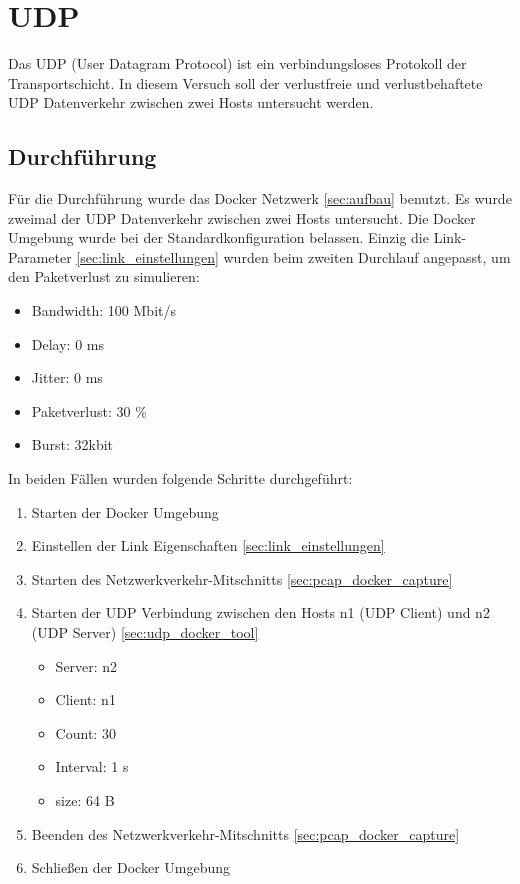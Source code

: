 \section{UDP}
Das UDP (User Datagram Protocol) ist ein verbindungsloses Protokoll der Transportschicht.
In diesem Versuch soll der verlustfreie und verlustbehaftete UDP Datenverkehr zwischen zwei Hosts untersucht werden.

\subsection{Durchführung}
Für die Durchführung wurde das Docker Netzwerk \ref{sec:aufbau} benutzt.
Es wurde zweimal der UDP Datenverkehr zwischen zwei Hosts untersucht.
Die Docker Umgebung wurde bei der Standardkonfiguration belassen. Einzig die Link-Parameter \ref{sec:link_einstellungen} wurden beim zweiten Durchlauf angepasst, um den Paketverlust zu simulieren:

\begin{itemize}[noitemsep]
    \item Bandwidth: 100 Mbit/s
    \item Delay: 0 ms
    \item Jitter: 0 ms
    \item Paketverlust: 30 \%
    \item Burst: 32kbit
\end{itemize}

In beiden Fällen wurden folgende Schritte durchgeführt:
\begin{enumerate}
    \item Starten der Docker Umgebung
    \item Einstellen der Link Eigenschaften \ref{sec:link_einstellungen}
    \item Starten des Netzwerkverkehr-Mitschnitts \ref{sec:pcap_docker_capture}
    \item Starten der UDP Verbindung zwischen den Hosts n1 (UDP Client) und n2 (UDP Server) \ref{sec:udp_docker_tool}
    \begin{itemize}[noitemsep]
        \item Server: n2
        \item Client: n1
        \item Count: 30
        \item Interval: 1 s
        \item size: 64 B
    \end{itemize}
    \item Beenden des Netzwerkverkehr-Mitschnitts \ref{sec:pcap_docker_capture}
    \item Schließen der Docker Umgebung
\end{enumerate}

